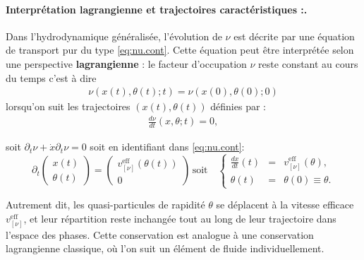 \paragraph{Interprétation lagrangienne et trajectoires caractéristiques :.}
Dans l’hydrodynamique généralisée, l’évolution de $\nu$ est décrite par une équation de transport pur du type \eqref{eq:nu.cont}. Cette équation peut être interprétée selon une perspective \textbf{lagrangienne} :  le facteur d’occupation $\nu$ reste constant au cours du temps c'est à dire  
\begin{eqnarray}\label{chap6:eq:traj_lagr_0}
	 \nu ( x(t) , \theta(t) ; t ) = \nu ( x(0) , \theta(0) ; 0 ) 
\end{eqnarray}
lorsqu’on suit les trajectoires $(x(t), \theta(t))$ définies par :  
\begin{eqnarray*}
	\frac{d \nu}{dt} (x , \theta ; t ) = 0,	
\end{eqnarray*}

soit $\partial_t \nu + \dot{x} \partial_t \nu = 0$ soit en identifiant dans \eqref{eq:nu.cont}:
\begin{equation}
\label{chap6:eq:traj_lagr_1}
\partial_t \left( \begin{array}{c} x(t) \\ \theta(t) \end{array} \right)  =  \left( \begin{array}{c} v^{\mathrm{eff}}_{[\nu]}(\theta(t)) \\ 0 \end{array} \right)\, \mbox{soit} \quad \left\{ \begin{array}{rcl}
\displaystyle \frac{d x}{dt}(t) & = & v^{\mathrm{eff}}_{[\nu]}(\theta), \\
\theta(t) & = & \theta(0) \equiv \theta.
\end{array} \right. 
\end{equation}

Autrement dit, les quasi-particules de rapidité $\theta$ se déplacent à la vitesse efficace $v^{\mathrm{eff}}_{[\nu]}$, et leur répartition reste inchangée tout au long de leur trajectoire dans l’espace des phases. Cette conservation est analogue à une conservation lagrangienne classique, où l’on suit un élément de fluide individuellement.

